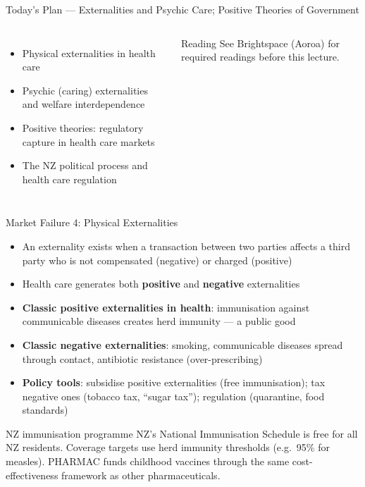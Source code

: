 \documentclass[aspectratio=169, 12pt]{beamer}
\newcommand{\planslide}[2]{%
  \begin{frame}{Today's Plan — #1}
    \begin{columns}
      \column{0.6\textwidth}
      \begin{itemize}#2\end{itemize}
      \column{0.38\textwidth}
      \begin{alertblock}{Reading}
        \footnotesize See Brightspace (Aoroa) for required readings before this lecture.
      \end{alertblock}
    \end{columns}
  \end{frame}}
\begin{document}
\planslide{Externalities and Psychic Care; Positive Theories of Government}{
  \item Physical externalities in health care
  \item Psychic (caring) externalities and welfare interdependence
  \item Positive theories: regulatory capture in health care markets
  \item The NZ political process and health care regulation
}

\begin{frame}{Market Failure 4: Physical Externalities}
  \begin{itemize}
    \item An externality exists when a transaction between two parties affects a third party
          who is not compensated (negative) or charged (positive)
    \item Health care generates both \textbf{positive} and \textbf{negative} externalities
    \item \textbf{Classic positive externalities in health}: immunisation against communicable
          diseases creates herd immunity --- a public good
    \item \textbf{Classic negative externalities}: smoking, communicable diseases spread through
          contact, antibiotic resistance (over-prescribing)
    \item \textbf{Policy tools}: subsidise positive externalities (free immunisation); tax
          negative ones (tobacco tax, ``sugar tax''); regulation (quarantine, food standards)
  \end{itemize}
  \begin{exampleblock}{NZ immunisation programme}
    NZ's National Immunisation Schedule is free for all NZ residents. Coverage targets use
    herd immunity thresholds (e.g.\ 95\% for measles). PHARMAC funds childhood vaccines through
    the same cost-effectiveness framework as other pharmaceuticals.
  \end{exampleblock}
\end{frame}
\end{document}
